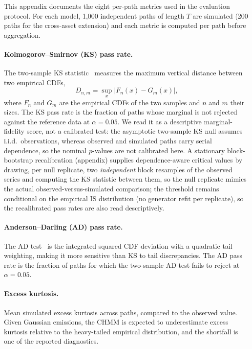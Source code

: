 This appendix documents the eight per-path metrics used in the evaluation protocol.
For each model, 1{,}000 independent paths of length $T$ are simulated (200 paths for the cross-asset extension) and each metric is computed per path before aggregation.

\paragraph{Kolmogorov--Smirnov (KS) pass rate.}
The two-sample KS statistic~\cite{kolmogorov1933, smirnov1948} measures the maximum vertical distance between two empirical CDFs,
\begin{equation}
    D_{n,m} = \sup_x |F_n(x) - G_m(x)|,
    \label{eq:ks}
\end{equation}
where $F_n$ and $G_m$ are the empirical CDFs of the two samples and $n$ and $m$ their sizes.
The KS pass rate is the fraction of paths whose marginal is not rejected against the reference data at $\alpha = 0.05$.
We read it as a descriptive marginal-fidelity score, not a calibrated test: the asymptotic two-sample KS null assumes i.i.d.\ observations, whereas observed and simulated paths carry serial dependence, so the nominal $p$-values are not calibrated here.
A stationary block-bootstrap recalibration (appendix) supplies dependence-aware critical values by drawing, per null replicate, two \emph{independent} block resamples of the observed series and computing the KS statistic between them, so the null replicate mimics the actual observed-versus-simulated comparison; the threshold remains conditional on the empirical IS distribution (no generator refit per replicate), so the recalibrated pass rates are also read descriptively.

\paragraph{Anderson--Darling (AD) pass rate.}
The AD test~\citep{scholz1987ksample} is the integrated squared CDF deviation with a quadratic tail weighting, making it more sensitive than KS to tail discrepancies.
The AD pass rate is the fraction of paths for which the two-sample AD test fails to reject at $\alpha = 0.05$.

\paragraph{Excess kurtosis.}
Mean simulated excess kurtosis across paths, compared to the observed value.
Given Gaussian emissions, the CHMM is expected to underestimate excess kurtosis relative to the heavy-tailed empirical distribution, and the shortfall is one of the reported diagnostics.

